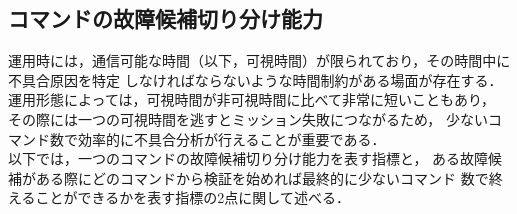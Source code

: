 \documentclass[11pt]{jsreport}
\begin{document}
\subsection{コマンドの故障候補切り分け能力}
運用時には，通信可能な時間（以下，可視時間）が限られており，その時間中に不具合原因を特定
しなければならないような時間制約がある場面が存在する．
運用形態によっては，可視時間が非可視時間に比べて非常に短いこともあり，
その際には一つの可視時間を逃すとミッション失敗につながるため，%
少ないコマンド数で効率的に不具合分析が行えることが重要である．\\
以下では，一つのコマンドの故障候補切り分け能力を表す指標と，
ある故障候補がある際にどのコマンドから検証を始めれば最終的に少ないコマンド
数で終えることができるかを表す指標の2点に関して述べる．
\end{document}
